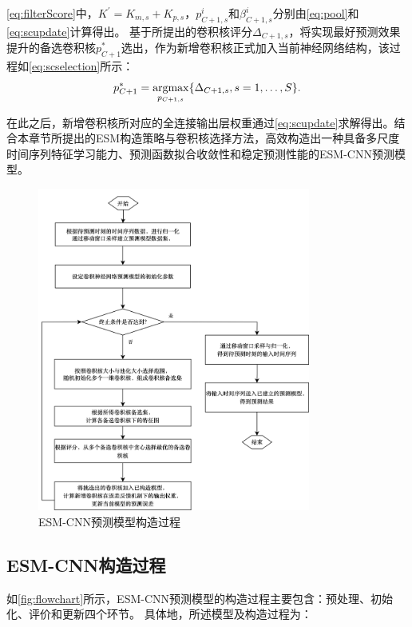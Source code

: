 \autoref{eq:filterScore}中，$K^{\prime} = K_{m,s} + K_{p,s}$，$p^i_{C+1, s}$和$\beta^i_{C+1, s}$分别由\autoref{eq:pool}和\autoref{eq:scupdate}计算得出。
基于所提出的卷积核评分$\Delta_{{C+1, s}}$，将实现最好预测效果提升的备选卷积核$p_{C+1}^{*}$选出，作为新增卷积核正式加入当前神经网络结构，该过程如\autoref{eq:scselection}所示：
\begin{equation}\label{eq:scselection}
    p_{C+1}^{*} = \operatorname*{argmax}\limits_{p_{{C+1},s}} \{ \Delta_{{C+1},s}, s = 1,\ldots,S \}.
\end{equation}

在此之后，新增卷积核所对应的全连接输出层权重通过\ref{eq:scupdate}求解得出。结合本章节所提出的ESM构造策略与卷积核选择方法，高效构造出一种具备多尺度时间序列特征学习能力、预测函数拟合收敛性和稳定预测性能的ESM-CNN预测模型。

\begin{figure}[!t]
    \centering
    \includegraphics[width = 0.8\textwidth]{float/ch.cnn/flow.png}
    \caption{\label{fig:flowchart} ESM-CNN预测模型构造过程}
\end{figure}

\subsection{ESM-CNN构造过程}
如\autoref{fig:flowchart}所示，ESM-CNN预测模型的构造过程主要包含：预处理、初始化、评价和更新四个环节。
具体地，所述模型及构造过程为：

